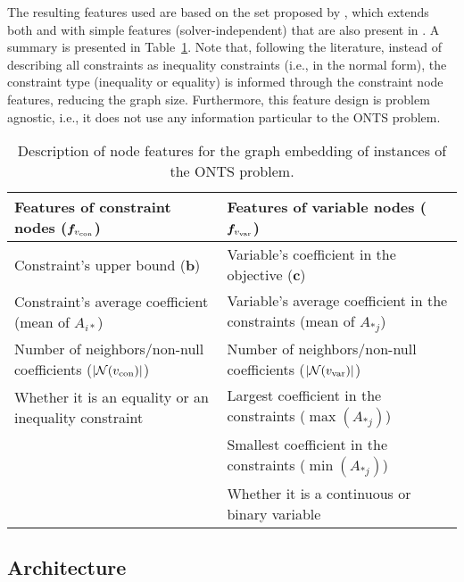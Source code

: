 The resulting features used are based on the set proposed by , which extends both  and  with simple features (solver-independent) that are also present in .
A summary is presented in Table~\ref{tab:feature-desc}.
Note that, following the literature, instead of describing all constraints as inequality constraints (i.e., in the normal form), the constraint type (inequality or equality) is informed through the constraint node features, reducing the graph size.
Furthermore, this feature design is problem agnostic, i.e., it does not use any information particular to the ONTS problem.

\begin{table}[h]
    \centering
    \begin{tabular}{p{7cm}|p{7cm}}
    \toprule
        Features of constraint nodes ($\bm{f}_{v_{\rm con}}$) & Features of variable nodes ($\bm{f}_{v_{\rm var}}$) \\
    \midrule
	Constraint's upper bound ($\bm{b}$)                     &  Variable's coefficient in the objective ($\bm{c}$)\\[0.8cm]
         Constraint's average coefficient (mean of $A_{i*}$)     &  Variable's average coefficient in the constraints (mean of $A_{*j}$) \\[0.8cm]
         Number of neighbors/non-null coefficients ($|\mathcal{N}(v_{\rm con})|$)    &  Number of neighbors/non-null coefficients ($|\mathcal{N}(v_{\rm var})|$) \\[0.8cm]
         Whether it is an equality or an inequality constraint &  Largest coefficient in the constraints ($\max(A_{*j})$) \\[0.8cm]
                                                                    &  Smallest coefficient in the constraints ($\min(A_{*j})$) \\[0.8cm]
                                                                    &  Whether it is a continuous or binary variable \\
    \bottomrule
    \end{tabular}
    \caption{Description of node features for the graph embedding of instances of the ONTS problem.}
    \label{tab:feature-desc}
\end{table}

\subsection{Architecture}

